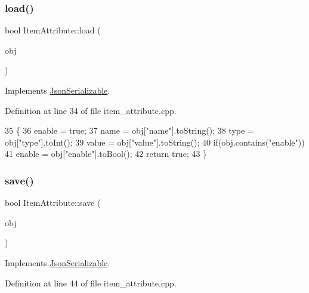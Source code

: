 \subsubsection{\texorpdfstring{load()}{load()}}
{\footnotesize\ttfamily bool Item\+Attribute\+::load (\begin{DoxyParamCaption}\item[{Q\+Json\+Object}]{obj }\end{DoxyParamCaption})\hspace{0.3cm}{\ttfamily [virtual]}}



Implements \hyperlink{class_json_serializable_a881aaead36cbf7d097bddfa08f204fd9}{Json\+Serializable}.



Definition at line 34 of file item\+\_\+attribute.\+cpp.


\begin{DoxyCode}
35 \{
36     enable = \textcolor{keyword}{true};
37     name = obj[\textcolor{stringliteral}{"name"}].toString();
38     type = obj[\textcolor{stringliteral}{"type"}].toInt();
39     value = obj[\textcolor{stringliteral}{"value"}].toString();
40     \textcolor{keywordflow}{if}(obj.contains(\textcolor{stringliteral}{"enable"}))
41         enable = obj[\textcolor{stringliteral}{"enable"}].toBool();
42     \textcolor{keywordflow}{return} \textcolor{keyword}{true};
43 \}
\end{DoxyCode}
\mbox{\label{class_item_attribute_a5622c9174b2b4e5c1d37b2e76d4ca2d9}} 
\subsubsection{\texorpdfstring{save()}{save()}}
{\footnotesize\ttfamily bool Item\+Attribute\+::save (\begin{DoxyParamCaption}\item[{Q\+Json\+Object}]{obj }\end{DoxyParamCaption})\hspace{0.3cm}{\ttfamily [virtual]}}



Implements \hyperlink{class_json_serializable_a98939816a5704c8d4c46f8571a5ae214}{Json\+Serializable}.



Definition at line 44 of file item\+\_\+attribute.\+cpp.


